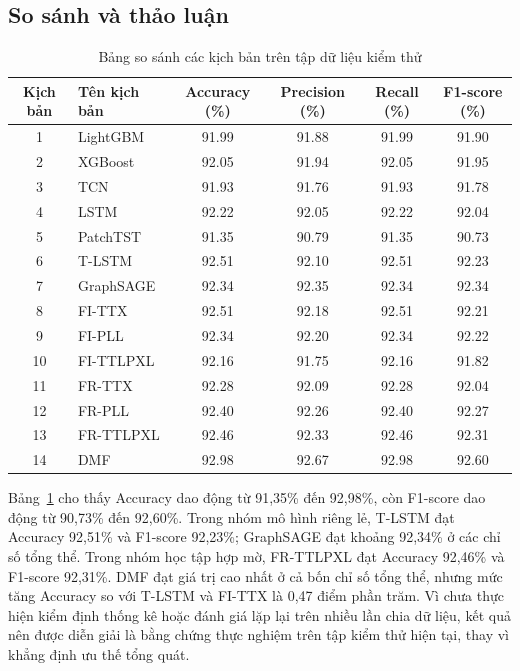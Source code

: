 \documentclass[10pt,twoside]{article}
\begin{document}
\subsection{So sánh và thảo luận}

\begin{table}[H]
\centering
\caption{Bảng so sánh các kịch bản trên tập dữ liệu kiểm thử}
\label{tab:test_scenarios_comparison}
\begin{tabular}{c l c c c c}
\hline
\textbf{Kịch bản} & \textbf{Tên kịch bản} & \textbf{Accuracy (\%)} & \textbf{Precision (\%)} & \textbf{Recall (\%)} & \textbf{F1-score (\%)} \\
\hline
1  & LightGBM   & 91.99 & 91.88 & 91.99 & 91.90 \\
2  & XGBoost    & 92.05 & 91.94 & 92.05 & 91.95 \\
3  & TCN        & 91.93 & 91.76 & 91.93 & 91.78 \\
4  & LSTM       & 92.22 & 92.05 & 92.22 & 92.04 \\
5  & PatchTST   & 91.35 & 90.79 & 91.35 & 90.73 \\
6  & T-LSTM     & 92.51 & 92.10 & 92.51 & 92.23 \\
7  & GraphSAGE  & 92.34 & 92.35 & 92.34 & 92.34 \\
8  & FI-TTX     & 92.51 & 92.18 & 92.51 & 92.21 \\
9  & FI-PLL     & 92.34 & 92.20 & 92.34 & 92.22 \\
10 & FI-TTLPXL  & 92.16 & 91.75 & 92.16 & 91.82 \\
11 & FR-TTX     & 92.28 & 92.09 & 92.28 & 92.04 \\
12 & FR-PLL     & 92.40 & 92.26 & 92.40 & 92.27 \\
13 & FR-TTLPXL  & 92.46 & 92.33 & 92.46 & 92.31 \\
14 & DMF        & 92.98 & 92.67 & 92.98 & 92.60 \\
\hline
\end{tabular}
\end{table}
Bảng~\ref{tab:test_scenarios_comparison} cho thấy Accuracy dao động từ 91,35\% đến 92,98\%, còn F1-score dao động từ 90,73\% đến 92,60\%. Trong nhóm mô hình riêng lẻ, T-LSTM đạt Accuracy 92,51\% và F1-score 92,23\%; GraphSAGE đạt khoảng 92,34\% ở các chỉ số tổng thể. Trong nhóm học tập hợp mờ, FR-TTLPXL đạt Accuracy 92,46\% và F1-score 92,31\%. DMF đạt giá trị cao nhất ở cả bốn chỉ số tổng thể, nhưng mức tăng Accuracy so với T-LSTM và FI-TTX là 0,47 điểm phần trăm. Vì chưa thực hiện kiểm định thống kê hoặc đánh giá lặp lại trên nhiều lần chia dữ liệu, kết quả nên được diễn giải là bằng chứng thực nghiệm trên tập kiểm thử hiện tại, thay vì khẳng định ưu thế tổng quát.
\end{document}
